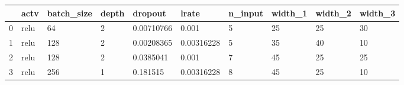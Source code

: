 \begin{tabular}{llllllllll}
\toprule
{} &  actv & batch\_size & depth &     dropout &       lrate & n\_input & width\_1 & width\_2 & width\_3 \\
\midrule
0 &  relu &         64 &     2 &  0.00710766 &       0.001 &       5 &      25 &      25 &      30 \\
1 &  relu &        128 &     2 &  0.00208365 &  0.00316228 &       5 &      35 &      40 &      10 \\
2 &  relu &        128 &     2 &   0.0385041 &       0.001 &       7 &      45 &      25 &      25 \\
3 &  relu &        256 &     1 &    0.181515 &  0.00316228 &       8 &      45 &      25 &      10 \\
\bottomrule
\end{tabular}
